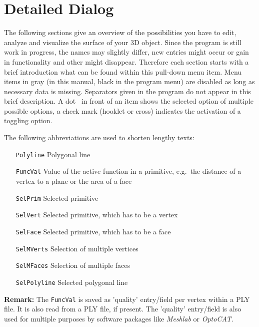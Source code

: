 \chapter{Detailed Dialog}
\label{detdia}

The following sections give an overview of the possibilities you have to edit, analyze and visualize the surface of your 3D object. Since the program is still work in progress, the names may slightly differ, new entries might occur or gain in functionality and other might disappear. Therefore each section starts with a brief introduction what can be found within this pull-down menu item. 
Menu items in gray (in this manual, black in the program menu) are disabled as long as necessary data is missing. Separators given in the program do not appear in this brief description.
A dot \textbullet\  in front of an item shows the selected option of multiple possible options, a check mark \checkmark (hooklet or cross) indicates the activation of a toggling option.

The following abbreviations are used to shorten lengthy texts:

\vspace*{0.5cm}

\hspace*{4.0cm}\begin{minipage}{10.0cm}
\em\small
\begin{itemize}
\item[\tt Polyline] Polygonal line
\item[\tt FuncVal] Value of the active function in a primitive, e.g.~the distance of a vertex to a plane or the area of a face\item[\tt SelPrim] Selected primitive
\item[\tt SelVert] Selected primitive, which has to be a vertex
\item[\tt SelFace] Selected primitive, which has to be a face
\item[\tt SelMVerts] Selection of multiple vertices
\item[\tt SelMFaces] Selection of multiple faces
\item[\tt SelPolyline] Selected polygonal line
\end{itemize}
\end{minipage}

\vspace*{0.5cm}

{\bf Remark:} The {\tt FuncVal} is saved as 'quality' entry/field per vertex within a PLY file. It is also read from a PLY file, if present. The 'quality' entry/field is also used for multiple purposes by software packages like {\em Meshlab} or {\em OptoCAT}. 


